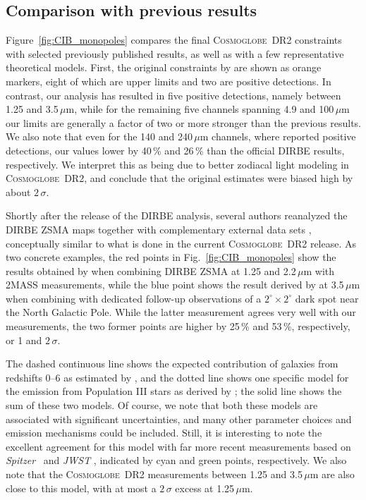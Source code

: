 \documentclass{aa}
\def\Spitzer{\textit{Spitzer}}
\newcommand{\cosmoglobe}{\textsc{Cosmoglobe}}
\begin{document}
\subsection{Comparison with previous results}

Figure~\ref{fig:CIB_monopoles} compares the final \cosmoglobe\ DR2
constraints with selected previously published results, as well as
with a few representative theoretical models. First, the original
constraints by \citet{hauser1998} are shown as orange markers, eight of
which are upper limits and two are positive detections. In
contrast, our analysis has resulted in five positive detections,
namely between 1.25 and 3.5\,$\mu\mathrm{m}$, while for the remaining
five channels spanning 4.9 and 100$\,\mu\mathrm{m}$ our limits are
generally a factor of two or more stronger than the previous
results. We also note that even for the 140 and 240$\,\mu\mathrm{m}$
channels, where \citet{hauser1998} reported positive detections, 
our values lower by 40\,\% and 26\,\% than the official DIRBE results,
respectively. We interpret this as being due to better zodiacal light
modeling in \cosmoglobe\ DR2, and conclude that the
original estimates were biased high by about $2\,\sigma$.

Shortly after the release of the DIRBE analysis, several authors
reanalyzed the DIRBE ZSMA maps together with complementary external
data sets \citep[e.g.,][]{wright:2000,wright:2001}, conceptually
similar to what is done in the current \cosmoglobe\ DR2 release. As
two concrete examples, the red points in
Fig.~\ref{fig:CIB_monopoles} show the results obtained by
\citet{cambresy:2001} when combining DIRBE ZSMA at 1.25 and
2.2$\,\mu\mathrm{m}$ with 2MASS measurements, while the blue point
shows the result derived by \citet{gorjian:2000} at
3.5$\,\mu\mathrm{m}$ when combining with dedicated follow-up
observations of a $2^{\circ}\times2^{\circ}$ dark spot near the North
Galactic Pole. While the latter measurement agrees very well with our
measurements, the two former points are higher by 25\,\% and 53\,\%,
respectively, or 1 and $2\,\sigma$.

The dashed continuous line shows the expected contribution of 
galaxies from redshifts 0--6 as estimated by \citet{finke2022}, and the
dotted line shows one specific model for the emission from Population III
stars as derived by \citet{santos:2002}; the solid line shows the sum
of these two models. Of course, we note that both these models are
associated with significant uncertainties, and many other parameter
choices and emission mechanisms could be included. Still, it is
interesting to note the excellent agreement for this model with far
more recent measurements based on \Spitzer\ \citep{bethermin:2010} and
\textit{JWST} \citep{stone:2024}, indicated by cyan and green points,
respectively. We also note that the \cosmoglobe\ DR2 measurements
between 1.25 and 3.5$\,\mu\mathrm{m}$ are also close to this model,
with at most a $2\,\sigma$ excess at 1.25$\,\mu\mathrm{m}$.
\end{document}
